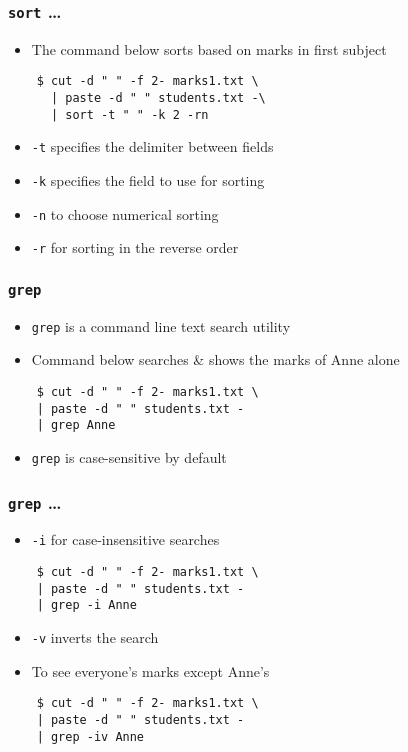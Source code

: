 \documentclass[12pt,compress]{beamer}
\begin{document}
\begin{frame}[fragile]
  \frametitle{\texttt{sort} \ldots}
  \begin{itemize}
  \item The command below sorts based on marks in first subject
  \end{itemize}
  \begin{lstlisting}
    $ cut -d " " -f 2- marks1.txt \
      | paste -d " " students.txt -\
      | sort -t " " -k 2 -rn
  \end{lstlisting} %
  \begin{itemize}
  \item \texttt{-t} specifies the delimiter between fields
  \item \texttt{-k} specifies the field to use for sorting
  \item \texttt{-n} to choose numerical sorting
  \item \texttt{-r} for sorting in the reverse order
  \end{itemize}
\end{frame}

\begin{frame}[fragile]
  \frametitle{\texttt{grep}}
  \begin{itemize}
  \item \texttt{grep} is a command line text search utility
  \item Command below searches \& shows the marks of Anne alone 
  \end{itemize}
  \begin{lstlisting}
    $ cut -d " " -f 2- marks1.txt \
    | paste -d " " students.txt - 
    | grep Anne
  \end{lstlisting} %
  \begin{itemize}
  \item \texttt{grep} is case-sensitive by default
  \end{itemize}
\end{frame}

\begin{frame}[fragile]
  \frametitle{\texttt{grep} \ldots}
  \begin{itemize}
  \item \texttt{-i} for case-insensitive searches
  \end{itemize}
  \begin{lstlisting}
    $ cut -d " " -f 2- marks1.txt \
    | paste -d " " students.txt - 
    | grep -i Anne
  \end{lstlisting} %
  \begin{itemize}
  \item \texttt{-v} inverts the search
  \item To see everyone's marks except Anne's
  \end{itemize}
  \begin{lstlisting}
    $ cut -d " " -f 2- marks1.txt \
    | paste -d " " students.txt - 
    | grep -iv Anne
  \end{lstlisting} %
\end{frame}
\end{document}
